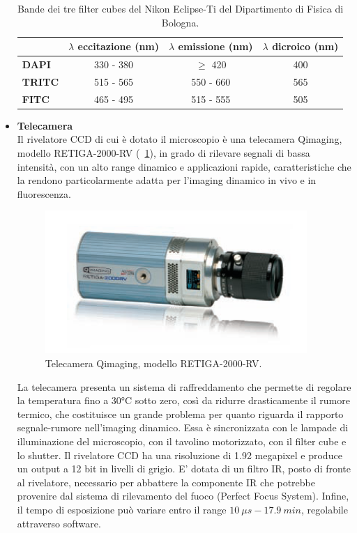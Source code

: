 \begin{itemize}
\begin{table}[!ht]
 \begin{center}
\begin{small}
\begin{tabular}{lccc}
\hline\hline
&\textbf{$\lambda$ eccitazione (nm)}&\textbf{$\lambda$ emissione (nm)}&\textbf{$\lambda$ dicroico (nm)}\\
\hline
\textbf{DAPI}&330 - 380&$\geq$ 420&400\\
\textbf{TRITC}&515 - 565&550 - 660&565\\
\textbf{FITC}&465 - 495&515 - 555&505\\
\hline\hline
\end{tabular}
\caption{\small{Bande dei tre filter cubes del Nikon Eclipse-Ti del Dipartimento di Fisica di Bologna.}}
\label{TAB}
\end{small}
\end{center}
\end{table}

\item \textbf{Telecamera}\\
Il rivelatore CCD di cui è dotato il microscopio è una telecamera Qimaging, modello RETIGA-2000-RV (\figurename~\ref{fig:CCD}), in grado di rilevare segnali di bassa intensità, con un alto range dinamico e applicazioni rapide, caratteristiche che la rendono particolarmente adatta per l'imaging dinamico in vivo e in fluorescenza.

\begin{figure}
 \centering
 \includegraphics[scale=.40]{img/CAP2CCD.png}
 \caption{\small{Telecamera Qimaging, modello RETIGA-2000-RV.}}
 \label{fig:CCD}
\end{figure}

La telecamera presenta un sistema di raffreddamento che permette di regolare la temperatura fino a 30°C sotto zero, così da ridurre drasticamente il rumore termico, che costituisce un grande problema per quanto riguarda il rapporto segnale-rumore nell'imaging dinamico.
Essa è sincronizzata con le lampade di illuminazione del microscopio, con il tavolino motorizzato, con il filter cube e lo shutter. 
Il rivelatore CCD ha una risoluzione di 1.92 megapixel e produce un output a 12 bit in livelli di grigio.
E' dotata di un filtro IR, posto di fronte al rivelatore, necessario per abbattere la componente IR che potrebbe provenire dal sistema di rilevamento del fuoco (Perfect Focus System). 
Infine, il tempo di esposizione può variare entro il range $10\ \mu s - 17.9\ min $, regolabile attraverso software.


\end{itemize}
